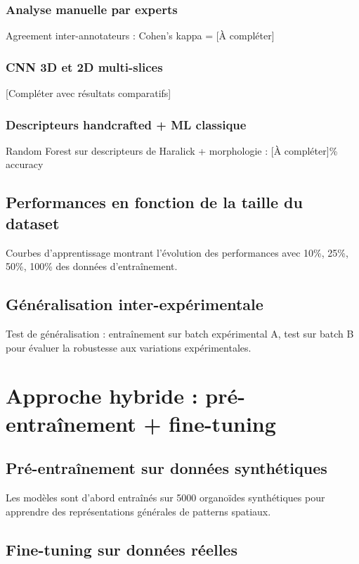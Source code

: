 \subsubsection{Analyse manuelle par experts}
Agreement inter-annotateurs : Cohen's kappa = [À compléter]

\subsubsection{CNN 3D et 2D multi-slices}
[Compléter avec résultats comparatifs]

\subsubsection{Descripteurs handcrafted + ML classique}
Random Forest sur descripteurs de Haralick + morphologie : [À compléter]\% accuracy

\subsection{Performances en fonction de la taille du dataset}

Courbes d'apprentissage montrant l'évolution des performances avec 10\%, 25\%, 50\%, 100\% des données d'entraînement.

\subsection{Généralisation inter-expérimentale}

Test de généralisation : entraînement sur batch expérimental A, test sur batch B pour évaluer la robustesse aux variations expérimentales.

\section{Approche hybride : pré-entraînement + fine-tuning}

\subsection{Pré-entraînement sur données synthétiques}

Les modèles sont d'abord entraînés sur 5000 organoïdes synthétiques pour apprendre des représentations générales de patterns spatiaux.

\subsection{Fine-tuning sur données réelles}

